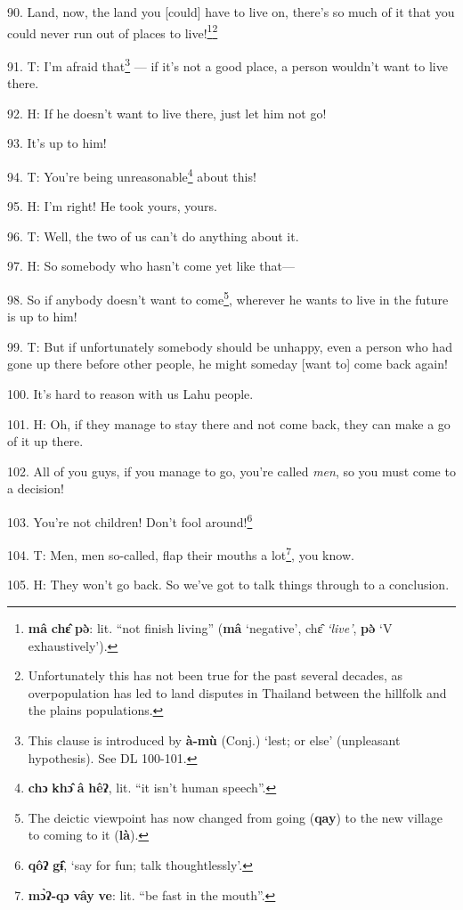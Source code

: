 90. Land, now, the land you [could] have to live on, there's so much of it that
you could never run out of places to live!\footnote{\textbf{mâ} \textbf{chɛ̂} \textbf{pə̀}: lit. ``not finish living'' (\textbf{mâ} `negative', chɛ̂\textit{ `live'}, \textbf{pə̀} `V exhaustively').}\footnote{Unfortunately this has not been true for the past several decades, as overpopulation has led to land disputes in Thailand between the hillfolk and the plains populations.}

91. T: I'm afraid that\footnote{This clause is introduced by \textbf{à-mù} (Conj.) `lest; or else' (unpleasant hypothesis). See DL 100-101.} --- if it's not a good place, a person wouldn't want
to live there.

92. H: If he doesn't want to live there, just let him not go!

93. It's up to him!

94. T: You're being unreasonable\footnote{\textbf{chɔ} \textbf{khɔ̂} \textbf{â} \textbf{hêʔ}, lit. ``it isn't human speech''.} about this!

95. H: I'm right! He took yours, yours.

96. T: Well, the two of us can't do anything about it.

97. H: So somebody who hasn't come yet like that---

98. So if anybody doesn't want to come\footnote{The deictic viewpoint has now changed from going (\textbf{qay}) to the new village to coming to it (\textbf{là}).}, wherever he wants to live in the future
is up to him!

99. T: But if unfortunately somebody should be unhappy, even a person who had gone
up there before other people, he might someday [want to] come back again!

100. It's hard to reason with us Lahu people.

101. H: Oh, if they manage to stay there and not come back, they can make a go
of it up there.

102. All of you guys, if you manage to go, you're called \textit{men}, so you must
come to a decision!

103. You're not children! Don't fool around!\footnote{\textbf{qôʔ} \textbf{gɨ̂}, `say for fun; talk thoughtlessly'.}

104. T: Men, men so-called, flap their mouths a lot\footnote{\textbf{mɔ̀ʔ-qɔ} \textbf{vây} \textbf{ve}: lit. ``be fast in the mouth''.}, you know.

105. H: They won't go back. So we've got to talk things through to a conclusion.


